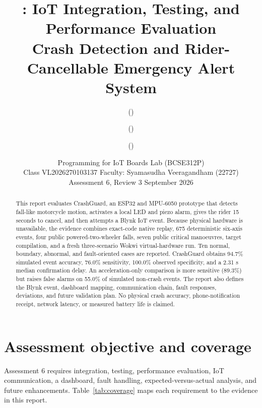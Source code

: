 \documentclass[12pt,a4paper]{article}
\title{\textbf{\ProjName: IoT Integration, Testing, and Performance Evaluation}\\
\large Crash Detection and Rider-Cancellable Emergency Alert System}
\author{\TeamMemberA{} (\TeamRegA) \and
        \TeamMemberB{} (\TeamRegB) \and
        \TeamMemberC{} (\TeamRegC)}
\date{Programming for IoT Boards Lab (BCSE312P)\\
Class VL2026270103137 \quad Faculty: Syamasudha Veeragandham (22727)\\
Assessment 6, Review 3 \quad 4 September 2026}
\begin{document}
\maketitle

\begin{abstract}
This report evaluates CrashGuard, an ESP32 and MPU-6050 prototype that detects
fall-like motorcycle motion, activates a local LED and piezo alarm, gives the
rider 15 seconds to cancel, and then attempts a Blynk IoT event. Because
physical hardware is unavailable, the evidence combines exact-code native
replay, 675 deterministic six-axis events, four public powered-two-wheeler
falls, seven public critical manoeuvres, target compilation, and a fresh
three-scenario Wokwi virtual-hardware run. Ten normal, boundary, abnormal, and
fault-oriented cases are reported. CrashGuard obtains 94.7\% simulated event
accuracy, 76.0\% sensitivity, 100.0\% observed specificity, and a 2.31 s median
confirmation delay. An acceleration-only comparison is more sensitive
(89.3\%) but raises false alarms on 55.0\% of simulated non-crash events.
The report also defines the Blynk event, dashboard mapping, communication
chain, fault responses, deviations, and future validation plan. No physical
crash accuracy, phone-notification receipt, network latency, or measured
battery life is claimed.
\end{abstract}

\clearpage
\tableofcontents
\clearpage

\section{Assessment objective and coverage}

Assessment 6 requires integration, testing, performance evaluation, IoT
communication, a dashboard, fault handling, expected-versus-actual analysis,
and future enhancements. Table~\ref{tab:coverage} maps each requirement to the
evidence in this report.
\end{document}
